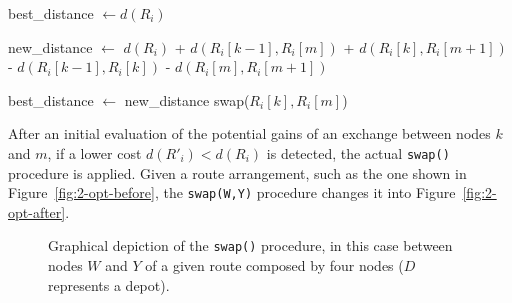\begin{algorithmic}[1]

    \State best\_distance $ \leftarrow d(R_i)$ 



            \State new\_distance $ \leftarrow $
            \Statex[4] $d(R_i)$ 
            \Statex[4] + $d(R_i[k - 1], R_i[m])$ 
            \Statex[4] + $d(R_i[k], R_i[m + 1])$ 
            \Statex[4] - $d(R_i[k - 1], R_i[k])$ 
            \Statex[4] - $d(R_i[m], R_i[m + 1])$


                \State best\_distance $ \leftarrow $ new\_distance
                \State swap($R_i[k],R_i[m]$)
            \EndIf

        \EndFor

    \EndFor

\EndFor
\end{algorithmic}\vertbreak

After an initial evaluation of the potential gains of an exchange between 
nodes $k$ and $m$, if a lower cost $d(R'_i) < d(R_i)$ is detected, the 
actual \verb?swap()? procedure is applied. Given a route arrangement, such as 
the one shown in Figure~\ref{fig:2-opt-before}, the \verb?swap(W,Y)? procedure 
changes it into Figure~\ref{fig:2-opt-after}.


\begin{figure}[h!]
    \centering



    \cprotect\caption{Graphical depiction of the \verb?swap()? procedure, 
        in this case between nodes $W$ and $Y$ of a given route composed by 
        four nodes ($D$ represents a depot).}
    \label{fig:2-opt}

\end{figure}

